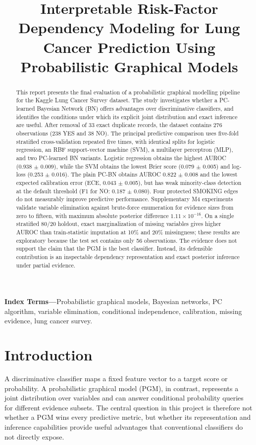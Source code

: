 \documentclass[conference]{IEEEtran}
\title{Interpretable Risk-Factor Dependency Modeling for Lung Cancer Prediction Using Probabilistic Graphical Models}
\author{
\IEEEauthorblockN{Priyam Modi, Rushin Modi, and Jash Odedara}
\IEEEauthorblockA{Group 1, CSE 516 -- Applied AI\\
School of Engineering and Applied Sciences\\
Ahmedabad University, Ahmedabad, India}
}
\begin{document}
\maketitle

\begin{abstract}
This report presents the final evaluation of a probabilistic graphical modelling pipeline for the Kaggle Lung Cancer Survey dataset. The study investigates whether a PC-learned Bayesian Network (BN) offers advantages over discriminative classifiers, and identifies the conditions under which its explicit joint distribution and exact inference are useful. After removal of 33 exact duplicate records, the dataset contains 276 observations (238 YES and 38 NO). The principal predictive comparison uses five-fold stratified cross-validation repeated five times, with identical splits for logistic regression, an RBF support-vector machine (SVM), a multilayer perceptron (MLP), and two PC-learned BN variants. Logistic regression obtains the highest AUROC (0.938 $\pm$ 0.009), while the SVM obtains the lowest Brier score (0.079 $\pm$ 0.005) and log-loss (0.253 $\pm$ 0.016). The plain PC-BN obtains AUROC 0.822 $\pm$ 0.008 and the lowest expected calibration error (ECE, 0.043 $\pm$ 0.005), but has weak minority-class detection at the default threshold (F1 for NO: 0.187 $\pm$ 0.080). Four protected SMOKING edges do not measurably improve predictive performance. Supplementary M4 experiments validate variable elimination against brute-force enumeration for evidence sizes from zero to fifteen, with maximum absolute posterior difference $1.11\times10^{-16}$. On a single stratified 80/20 holdout, exact marginalization of missing variables gives higher AUROC than train-statistic imputation at 10\% and 20\% missingness; these results are exploratory because the test set contains only 56 observations. The evidence does not support the claim that the PGM is the best classifier. Instead, its defensible contribution is an inspectable dependency representation and exact posterior inference under partial evidence.
\end{abstract}

\noindent\textbf{Index Terms---}Probabilistic graphical models, Bayesian networks, PC algorithm, variable elimination, conditional independence, calibration, missing evidence, lung cancer survey.

\section{Introduction}
A discriminative classifier maps a fixed feature vector to a target score or probability. A probabilistic graphical model (PGM), in contrast, represents a joint distribution over variables and can answer conditional probability queries for different evidence subsets. The central question in this project is therefore not whether a PGM wins every predictive metric, but whether its representation and inference capabilities provide useful advantages that conventional classifiers do not directly expose.
\end{document}
